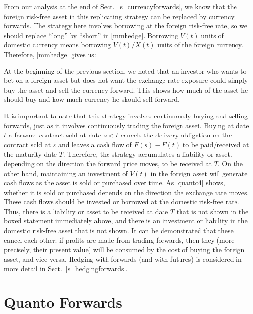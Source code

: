 From our analysis at the end of Sect.~\ref{s_currencyforwards}, we know that the  foreign risk-free asset in this replicating strategy can be replaced by currency forwards.  The strategy here involves borrowing at the foreign risk-free rate, so we should replace ``long'' by ``short'' in  \eqref{mmhedge}.  Borrowing $V(t)$ units of  domestic currency means borrowing $V(t)/X(t)$ units of the foreign currency.  Therefore,  \eqref{mmhedge} gives us:

At the beginning of the previous section, we noted that an investor who wants to bet on a foreign asset but does not want the exchange rate exposure could simply buy the asset and sell the currency forward.  This shows how much of the asset he should buy and how much currency he should sell forward.

It is important to note that this strategy involves continuously buying and selling forwards, just as it involves continuously trading the foreign asset.    Buying at date $t$ a forward contract sold at date $s<t$ cancels the delivery obligation on the contract sold at $s$ and leaves a cash flow of $F(s)-F(t)$ to be paid/received at the maturity date $T$.  Therefore, the strategy accumulates a liability or asset, depending on the direction the forward price moves, to be received at $T$.  On the other hand, maintaining an investment of $V(t)$ in the foreign asset will generate cash flows as the asset is sold or purchased over time.  As  \eqref{quanto4} shows, whether it is sold or purchased depends on the direction the exchange rate moves.  These cash flows should be invested or borrowed at the domestic risk-free rate.  Thus, there is a liability or asset to be received at date $T$ that is not shown in the boxed statement immediately above, and there is an investment or liability in the domestic risk-free asset that is not shown.  It can be demonstrated that these cancel each other: if profits are made from trading forwards, then they (more precisely, their present value) will be consumed by the cost of buying the foreign asset, and vice versa.  Hedging with  forwards (and with futures) is considered in more detail in Sect.~\ref{s_hedgingforwards}.



\section{Quanto Forwards}\label{s_quantoforwards}

